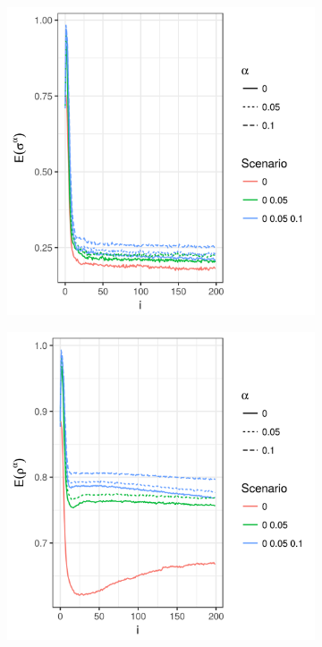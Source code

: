 \documentclass[a4paper]{article}
\begin{document}
\begin{figure}
\begin{subfigure}[]{0.3\textwidth}
    \includegraphics[width=\textwidth]{simulation/results/round-3/plots/entropy-sender-all-strong.png}
    \label{fig:entropy-sender-tight-interaction}
  \end{subfigure}
  \hfill
  \begin{subfigure}[]{0.3\textwidth}
    \includegraphics[width=\textwidth]{simulation/results/round-3/plots/entropy-receiver-all-strong.png}
    \label{fig:entropy-receiver-tight-interaction}
  \end{subfigure}
  \caption{}
  \label{fig:metrics-tight-interaction}
\end{figure}
\end{document}
